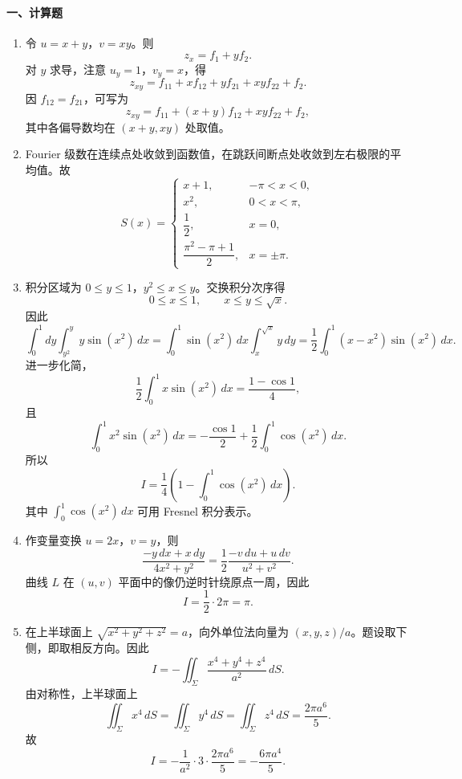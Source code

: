 \paragraph*{一、计算题}
\begin{enumerate}
  \item 令 $u=x+y$，$v=xy$。则
  \[
    z_x=f_1+ yf_2.
  \]
  对 $y$ 求导，注意 $u_y=1$，$v_y=x$，得
  \[
    z_{xy}=f_{11}+xf_{12}+yf_{21}+xyf_{22}+f_2.
  \]
  因 $f_{12}=f_{21}$，可写为
  \[
    z_{xy}=f_{11}+(x+y)f_{12}+xyf_{22}+f_2,
  \]
  其中各偏导数均在 $(x+y,xy)$ 处取值。
  \item Fourier 级数在连续点处收敛到函数值，在跳跃间断点处收敛到左右极限的平均值。故
  \[
    S(x)=
    \begin{cases}
      x+1, & -\pi<x<0,\\
      x^2, & 0<x<\pi,\\
      \dfrac12, & x=0,\\
      \dfrac{\pi^2-\pi+1}{2}, & x=\pm\pi.
    \end{cases}
  \]
  \item 积分区域为 $0\le y\le 1$，$y^2\le x\le y$。交换积分次序得
  \[
    0\le x\le 1,\qquad x\le y\le \sqrt{x}.
  \]
  因此
  \[
    \int_0^1dy\int_{y^2}^{y}y\sin(x^2)\,dx
    =\int_0^1\sin(x^2)\,dx\int_x^{\sqrt{x}}y\,dy
    =\frac12\int_0^1(x-x^2)\sin(x^2)\,dx.
  \]
  进一步化简，
  \[
    \frac12\int_0^1x\sin(x^2)\,dx=\frac{1-\cos1}{4},
  \]
  且
  \[
    \int_0^1x^2\sin(x^2)\,dx=-\frac{\cos1}{2}+\frac12\int_0^1\cos(x^2)\,dx.
  \]
  所以
  \[
    I=\frac14\left(1-\int_0^1\cos(x^2)\,dx\right).
  \]
  其中 $\int_0^1\cos(x^2)\,dx$ 可用 Fresnel 积分表示。
  \item 作变量变换 $u=2x$，$v=y$，则
  \[
    \frac{-y\,dx+x\,dy}{4x^2+y^2}
    =\frac12\frac{-v\,du+u\,dv}{u^2+v^2}.
  \]
  曲线 $L$ 在 $(u,v)$ 平面中的像仍逆时针绕原点一周，因此
  \[
    I=\frac12\cdot 2\pi=\pi.
  \]
  \item 在上半球面上 $\sqrt{x^2+y^2+z^2}=a$，向外单位法向量为 $(x,y,z)/a$。题设取下侧，即取相反方向。因此
  \[
    I=-\iint_\Sigma \frac{x^4+y^4+z^4}{a^2}\,dS.
  \]
  由对称性，上半球面上
  \[
    \iint_\Sigma x^4\,dS=\iint_\Sigma y^4\,dS=\iint_\Sigma z^4\,dS=\frac{2\pi a^6}{5}.
  \]
  故
  \[
    I=-\frac1{a^2}\cdot 3\cdot\frac{2\pi a^6}{5}
    =-\frac{6\pi a^4}{5}.
  \]
\end{enumerate}

